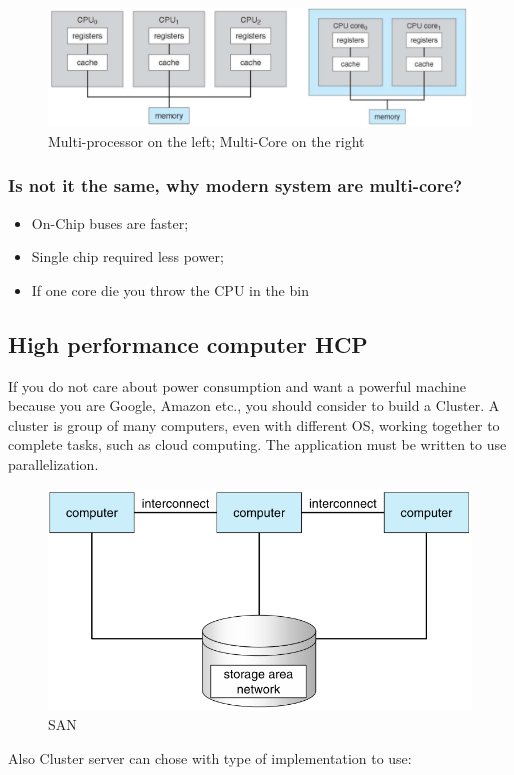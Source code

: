 \begin{figure}[htbp]
    \centering
    \includegraphics[width=1\linewidth]{img/multiP.png}
    \caption{Multi-processor on the left; Multi-Core on the right}
\end{figure}

\subsubsection{Is not it the same, why modern system are multi-core?}

\begin{itemize}
    \item On-Chip buses are faster;
    \item Single chip required less power;
    \item If one core die you throw the CPU in the bin
\end{itemize}

\subsection{High performance computer \textbf{HCP}}
If you do not care about power consumption and want a powerful machine because you are Google, Amazon etc., you should consider to build a Cluster.
A cluster is group of many computers, even with different OS, working together to complete tasks, such as cloud computing.
The application must be written to use parallelization.
\begin{figure}[htbp]
    \centering
    \includegraphics[width=0.6\linewidth]{img/SAN.png}
    \caption{SAN}
\end{figure}

Also Cluster server can chose with type of implementation to use:

